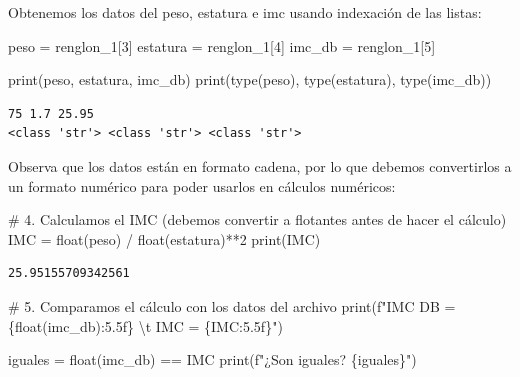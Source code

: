 \documentclass[
  spanish,
  letterpaper,
]{scrbook}
\newenvironment{Shaded}{\begin{snugshade}}{\end{snugshade}}
\newcommand{\BuiltInTok}[1]{\textcolor[rgb]{0.00,0.23,0.31}{#1}}
\newcommand{\CharTok}[1]{\textcolor[rgb]{0.13,0.47,0.30}{#1}}
\newcommand{\CommentTok}[1]{\textcolor[rgb]{0.37,0.37,0.37}{#1}}
\newcommand{\DecValTok}[1]{\textcolor[rgb]{0.68,0.00,0.00}{#1}}
\newcommand{\NormalTok}[1]{\textcolor[rgb]{0.00,0.23,0.31}{#1}}
\newcommand{\OperatorTok}[1]{\textcolor[rgb]{0.37,0.37,0.37}{#1}}
\newcommand{\SpecialCharTok}[1]{\textcolor[rgb]{0.37,0.37,0.37}{#1}}
\newcommand{\SpecialStringTok}[1]{\textcolor[rgb]{0.13,0.47,0.30}{#1}}
\theoremstyle{definition}
\theoremstyle{remark}
\begin{document}
Obtenemos los datos del peso, estatura e imc usando indexación de las
listas:

\begin{Shaded}
\begin{Highlighting}[]
\NormalTok{peso }\OperatorTok{=}\NormalTok{ renglon\_1[}\DecValTok{3}\NormalTok{]}
\NormalTok{estatura }\OperatorTok{=}\NormalTok{ renglon\_1[}\DecValTok{4}\NormalTok{]}
\NormalTok{imc\_db }\OperatorTok{=}\NormalTok{ renglon\_1[}\DecValTok{5}\NormalTok{]}

\BuiltInTok{print}\NormalTok{(peso, estatura, imc\_db)}
\BuiltInTok{print}\NormalTok{(}\BuiltInTok{type}\NormalTok{(peso), }\BuiltInTok{type}\NormalTok{(estatura), }\BuiltInTok{type}\NormalTok{(imc\_db))}
\end{Highlighting}
\end{Shaded}

\begin{verbatim}
75 1.7 25.95
<class 'str'> <class 'str'> <class 'str'>
\end{verbatim}

Observa que los datos están en formato cadena, por lo que debemos
convertirlos a un formato numérico para poder usarlos en cálculos
numéricos:

\begin{Shaded}
\begin{Highlighting}[]
\CommentTok{\# 4. Calculamos el IMC (debemos convertir a flotantes antes de hacer el cálculo)}
\NormalTok{IMC }\OperatorTok{=} \BuiltInTok{float}\NormalTok{(peso) }\OperatorTok{/} \BuiltInTok{float}\NormalTok{(estatura)}\OperatorTok{**}\DecValTok{2}
\BuiltInTok{print}\NormalTok{(IMC)}
\end{Highlighting}
\end{Shaded}

\begin{verbatim}
25.95155709342561
\end{verbatim}

\begin{Shaded}
\begin{Highlighting}[]
\CommentTok{\# 5. Comparamos el cálculo con los datos del archivo}
\BuiltInTok{print}\NormalTok{(}\SpecialStringTok{f"IMC DB = }\SpecialCharTok{\{}\BuiltInTok{float}\NormalTok{(imc\_db)}\SpecialCharTok{:5.5f\}}\SpecialStringTok{ }\CharTok{\textbackslash{}t}\SpecialStringTok{ IMC = }\SpecialCharTok{\{}\NormalTok{IMC}\SpecialCharTok{:5.5f\}}\SpecialStringTok{"}\NormalTok{)}

\NormalTok{iguales }\OperatorTok{=} \BuiltInTok{float}\NormalTok{(imc\_db) }\OperatorTok{==}\NormalTok{ IMC}
\BuiltInTok{print}\NormalTok{(}\SpecialStringTok{f"¿Son iguales? }\SpecialCharTok{\{}\NormalTok{iguales}\SpecialCharTok{\}}\SpecialStringTok{"}\NormalTok{)}
\end{Highlighting}
\end{Shaded}
\end{document}
